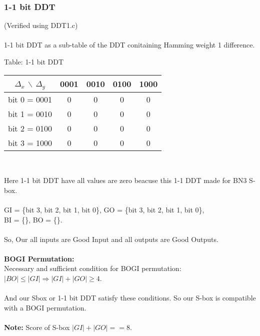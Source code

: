 \documentclass{article}
\begin{document}
\subsubsection{1-1 bit DDT}
(Verified using DDT1.c)\\\\
1-1 bit DDT as a sub-table of the DDT conitaining Hamming weight 1 difference.\\
\begin{center}
	Table: 1-1 bit DDT\\
\begin{tabular}{|c|c|c|c|c|}
	\hline
	 $\Delta_x$ $\backslash$ $\Delta_y$ &0001 &0010 & 0100 & 1000\\
	\hline
	bit 0 = 0001&0&0 &0 &0 \\
	\hline
	bit 1 = 0010&0&0 &0 &0 \\
	\hline
	bit 2 = 0100&0&0 &0 &0 \\
	\hline
	bit 3 = 1000&0&0 &0 &0 \\
	\hline
\end{tabular}\\
\end{center}
Here 1-1 bit DDT have all values are zero beacuse this 1-1 DDT made for BN3 S-box.\\\\
	GI = \{bit 3, bit 2, bit 1, bit 0\}, 	GO = \{bit 3, bit 2, bit 1, bit 0\}, \\
	BI = \{\}, BO = \{\}. \\\\
	So, Our all inputs are Good Input and all outputs are Good Outputs.\\\\
\textbf{BOGI Permutation:}\\
Necessary and sufficient condition for BOGI permutation:\\
$|BO|\le|GI|\Rightarrow |GI|+|GO|\ge4$.\\\\
And our Sbox or 1-1 bit DDT satisfy these conditions. So our S-box is compatible with a BOGI permutation.\\\\
\textbf{Note:} Score of S-box $|GI|+|GO|==8.$\\\\
\end{document}
